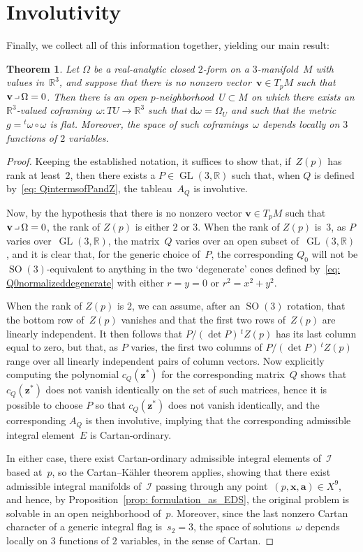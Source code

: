 \documentclass[11pt]{article}
\numberwithin{equation}{section}
\newtheorem{Theorem}{Theorem}[section]
\renewcommand{\d}{\mathrm{d}}%
\newcommand{\cI}{{\mathcal I}}
\newcommand{\bbR}{{\mathbb R}}
\newcommand{\GL}{\operatorname{GL}}
\newcommand{\SO}{\operatorname{SO}}
\newcommand{\mba}{\mathbf{a}}
\newcommand{\mbv}{\mathbf{v}}
\newcommand{\mbx}{\mathbf{x}}
\newcommand{\mbz}{\mathbf{z}}
\newcommand{\lhk}{\mathbin{\hbox{\vrule height1.4pt width4pt depth-1pt
 \vrule height4pt width0.4pt depth-1pt}}}
\begin{document}
\section{Involutivity}\label{sec: Involutivity}
Finally, we collect all of this information together,
yielding our main result:
\begin{Theorem}\label{nondegenerate-involutive-theorem}
Let $\Omega$ be a real-analytic closed $2$-form on a $3$-manifold~$M$ with values in~$\bbR^3$, and suppose that there is no nonzero vector~$\mbv\in T_pM$
such that $\mbv\lhk\Omega = 0$. Then there is an open $p$-neighborhood~$U\subset M$ on which there exists an $\bbR^3$-valued coframing~$\omega\colon TU\to\bbR^3$
such that $\d\omega = \Omega_U$ and such that the metric~$g = {}^t\omega\circ \omega$ is flat. Moreover, the space of such coframings~$\omega$ depends locally on $3$ functions of $2$ variables.
\end{Theorem}
\begin{proof}Keeping the established notation, it suffices to show that, if~$Z(p)$ has rank at least~$2$, then there exists a $P\in\GL(3,\bbR)$ such that, when $Q$ is defined by~\eqref{eq: QintermsofPandZ}, the tableau~$A_Q$ is involutive.

Now, by the hypothesis that there is no nonzero vector $\mbv\in T_pM$
such that $\mbv\lhk\Omega=0$, the rank of $Z(p)$ is either $2$ or $3$.
When the rank of $Z(p)$ is~$3$,
as $P$ varies over~$\GL(3,\bbR)$,
the matrix~$Q$ varies over an open subset of~$\GL(3,\bbR)$,
and it is clear that, for the generic choice of~$P$,
the corresponding $Q_0$ will not be $\SO(3)$-equivalent to anything
in the two `degenerate' cones defined by~\eqref{eq: Q0normalizeddegenerate}
with either $r=y=0$ or $r^2=x^2+y^2$.

When the rank of $Z(p)$ is $2$, we can assume, after an $\SO(3)$ rotation,
that the bottom row of~$Z(p)$ vanishes and that the first two rows of~$Z(p)$
are linearly independent. It then follows that $P/(\det P)\, {}^t\!Z(p)$
has its last column equal to zero, but that, as $P$ varies, the first
two columns of $P/(\det P)\, {}^t\!Z(p)$ range over all linearly independent
pairs of column vectors. Now explicitly computing the polynomial $c_Q(\mbz^*)$
for the corresponding matrix~$Q$ shows that $c_Q(\mbz^*)$ does not vanish
identically on the set of such matrices, hence it is possible to choose $P$
so that $c_Q(\mbz^*)$ does not vanish identically, and the corresponding $A_Q$
is then involutive, implying that the corresponding admissible integral
element~$E$ is Cartan-ordinary.

In either case, there exist Cartan-ordinary admissible integral elements
of~$\cI$ based at~$p$, so the Cartan--K\"ahler theorem applies, showing
that there exist admissible integral manifolds of~$\cI$ passing through
any point~$(p,\mbx,\mba)\in X^9$, and hence,
by Proposition~\ref{prop: formulation_as_EDS},
the original problem is solvable in an open neighborhood of~$p$.
Moreover, since the last nonzero Cartan character
of a generic integral flag is~$s_2 = 3$,
the space of solutions~$\omega$
depends locally on $3$ functions of $2$ variables,
in the sense of Cartan.
\end{proof}
\end{document}
